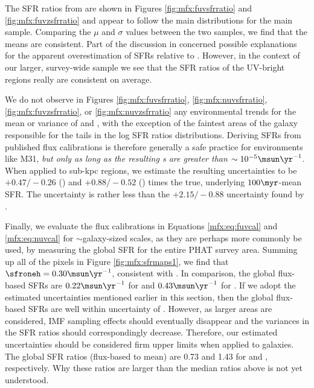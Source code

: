 The \fuv{} SFR ratios from \citet{Simones:2014} are shown in Figures
\ref{fig:mfx:fuvsfrratio} and \ref{fig:mfx:fuvzsfrratio} and appear to follow
the main distributions for the main sample. Comparing the $\mu$ and $\sigma$
values between the two samples, we find that the means are consistent. Part of
the discussion in \citet{Simones:2014} concerned possible explanations for the
apparent overestimation of SFRs relative to \sfroneh{}. However, in the context
of our larger, survey-wide sample we see that the SFR ratios of the UV-bright
regions really are consistent on average.

We do not observe in Figures \ref{fig:mfx:fuvsfrratio},
\ref{fig:mfx:nuvsfrratio}, \ref{fig:mfx:fuvzsfrratio}, or
\ref{fig:mfx:nuvzsfrratio} any environmental trends for the mean or variance of
\sfrx{} and \sfrxz{}, with the exception of the faintest areas of the galaxy
responsible for the tails in the log SFR ratios distributions. Deriving SFRs
from published flux calibrations is therefore generally a safe practice for
environments like M31, \emph{but only as long as the resulting \sfr{}s are
greater than $\sim 10^{-5}\msun\yr^{-1}$}. When applied to sub-kpc regions, we
estimate the resulting uncertainties to be $+\!0.47/\!-\!0.26$ (\fuv{}) and
$+\!0.88/\!-\!0.52$ (\nuv{}) times the true, underlying $100\myr$-mean SFR. The
\sfrfuv{} uncertainty is rather less than the $+\!2.15/\!-\!0.88$ uncertainty
found by \citet{Simones:2014}.

Finally, we evaluate the flux calibrations in Equations \ref{mfx:eq:fuvcal} and
\ref{mfx:eq:nuvcal} for $\sim$galaxy-sized scales, as they are perhaps more
commonly be used, by measuring the global SFR for the entire PHAT survey area.
Summing up all of the pixels in Figure \ref{fig:mfx:sfrmaps1}, we find that
$\sfroneh=0.30\msun\yr^{-1}$, consistent with \citet{Lewis:2014}. In
comparison, the global flux-based SFRs are $0.22\msun\yr^{-1}$ for \fuv{} and
$0.43\msun\yr^{-1}$ for \nuv{}. If we adopt the estimated uncertainties
mentioned earlier in this section, then the global flux-based SFRs are well
within uncertainty of \sfroneh{}. However, as larger areas are considered, IMF
sampling effects should eventually disappear and the variances in the SFR
ratios should correspondingly decrease. Therefore, our estimated uncertainties
should be considered firm upper limits when applied to galaxies. The global SFR
ratios (flux-based to mean) are 0.73 and 1.43 for \fuv{} and \nuv{},
respectively. Why these ratios are larger than the median ratios above is not
yet understood.





